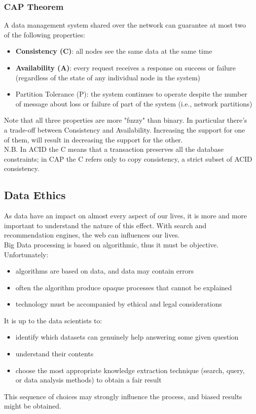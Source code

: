 \documentclass[10pt,a4paper]{article}
\begin{document}
\subsubsection{CAP Theorem}
A data management system shared over the network can guarantee at most two of the following properties:
\begin{itemize}
	\item \textbf{Consistency (C)}: all nodes see the same data at the same time
	\item \textbf{Availability (A)}: every request receives a response on success or failure (regardless of the
state of any individual node in the system)
	\item Partition Tolerance (P): the system continues to operate despite the number of message about loss or failure of part of the system (i.e., network partitions)
\end{itemize}
Note that all three properties are more "fuzzy" than binary. In particular there's a trade-off between Consistency and Availability. Increasing the support for one of them, will result in decreasing the support for the other. \\
N.B. In ACID the C means that a transaction preserves all the database constraints; in CAP the C refers only to copy consistency, a strict subset of ACID consistency.
\pagebreak
\subsection{Data Ethics}
As data have an impact on almost every aspect of our lives, it is more and more important to understand the nature of this effect. With search and recommendation engines, the web can influences our lives. \\
Big Data processing is based on algorithmic, thus it must be objective. Unfortunately:
\begin{itemize}
	\item algorithms are based on data, and data may contain errors
	\item often the algorithm produce opaque processes that cannot be explained
	\item technology must be accompanied by ethical and legal considerations
\end{itemize}
It is up to the data scientists to:
\begin{itemize}
	\item identify which datasets can genuinely help answering some given question
	\item understand their contents
	\item choose the most appropriate knowledge extraction technique (search, query, or data analysis methods) to obtain a fair result
\end{itemize}
This sequence of choices may strongly influence the process, and biased results might be obtained.
\end{document}
